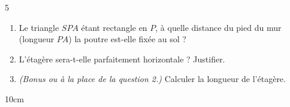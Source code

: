 \documentclass[a4paper]{book}
\begin{document}
{\begin{exerciceNote}{5}
        \begin{enumerate}
            \item Le triangle $SPA$ étant rectangle en $P$, à quelle distance du pied du mur (longueur $PA$) la poutre est-elle fixée au sol ?
            \item L'étagère sera-t-elle parfaitement horizontale ? Justifier.
            \item \textit{(Bonus ou à la place de la question 2.)} Calculer la longueur de l'étagère.
        \end{enumerate}
        
        \begin{ZoneReponse}{10cm}
        \end{ZoneReponse}
    \end{exerciceNote}

}
\end{document}
